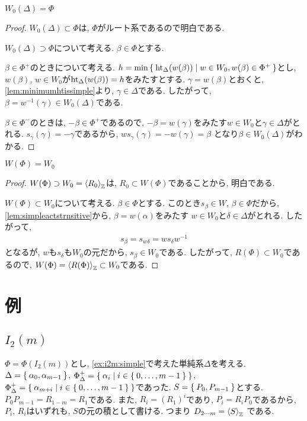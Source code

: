 \begin{lemma}
  \label{lem:simpleactstrnsitive}
  $W_0(\Delta)=\Phi$
\end{lemma}
\begin{proof}
  $W_0(\Delta)\subset \Phi$は, $\Phi$がルート系であるので明白である.

  $W_0(\Delta)\supset \Phi$について考える.
  $\beta\in \Phi$とする.

  $\beta\in\Phi^+$のときについて考える.
  $h=\min\Set{\operatorname{ht}_\Delta(w(\beta))|w\in W_0,w(\beta)\in\Phi^+}$とし,
  $w(\beta)$, $w\in W_0$が$\operatorname{ht}_\Delta(w(\beta))=h$をみたすとする.
  $\gamma=w(\beta)$とおくと,
  \cref{lem:minimumhtissimple}より,
  $\gamma\in\Delta$である.
  したがって, $\beta=w^{-1}(\gamma)\in W_0(\Delta)$である.

  $\beta\in\Phi^-$のときは, $-\beta\in\Phi^+$であるので,
  $-\beta=w(\gamma)$をみたす$w\in W_0$と$\gamma\in\Delta$がとれる.
  $s_\gamma(\gamma)=-\gamma$であるから,
  $ws_\gamma(\gamma)=-w(\gamma)=\beta$
  となり$\beta\in W_0(\Delta)$がわかる.
\end{proof}


\begin{theorem}
  $W(\Phi)=W_0$
\end{theorem}
\begin{proof}
  $W(\Phi)\supset W_0=\Braket{R_0}_{\mathbb{Z}}$は,
  $R_0\subset W(\Phi)$であることから,
  明白である.

  $W(\Phi)\subset W_0$について考える.
  $\beta\in\Phi$とする.
  このとき$s_\beta\in W$, $\beta\in\Phi$だから,
  \cref{lem:simpleactstrnsitive}から,
  $\beta=w(\alpha)$をみたす
  $w\in W_0$と$\delta\in\Delta$がとれる.
  したがって,
  \begin{align*}
    s_\beta=s_{w\delta}=ws_\delta w^{-1}
  \end{align*}
  となるが, $w$も$s_\delta$も$W_0$の元だから,
  $s_\beta\in W_0$である.
  したがって, $R(\Phi)\subset W_0$であるので,
  $W(\Phi)=\Braket{R(\Phi)}_{\mathbb{Z}}\subset W_0$である.
\end{proof}


\section{例}

\subsection{$I_2(m)$}
$\Phi=\Phi(I_2(m))$とし,
\cref{ex:i2m:simple}で考えた単純系$\Delta$を考える.
$\Delta=\Set{\alpha_0,\alpha_{m-1}}$,
$\Phi_\Delta^+=\Set{\alpha_i|i\in\Set{0,\ldots,m-1}}$,
$\Phi_\Delta^+=\Set{\alpha_{m+i}|i\in\Set{0,\ldots,m-1}}$であった.
$S=\Set{P_0,P_{m-1}}$とする.
$P_0P_{m-1}=R_{1-m}=R_1$である.
また, $R_i=(R_1)^i$であり, $P_i=R_iP_0$であるから,
$P_i$, $R_i$はいずれも, $S$の元の積として書ける.
つまり
$D_{2\cdots m}=\Braket{S}_{\mathbb{Z}}$
である.

